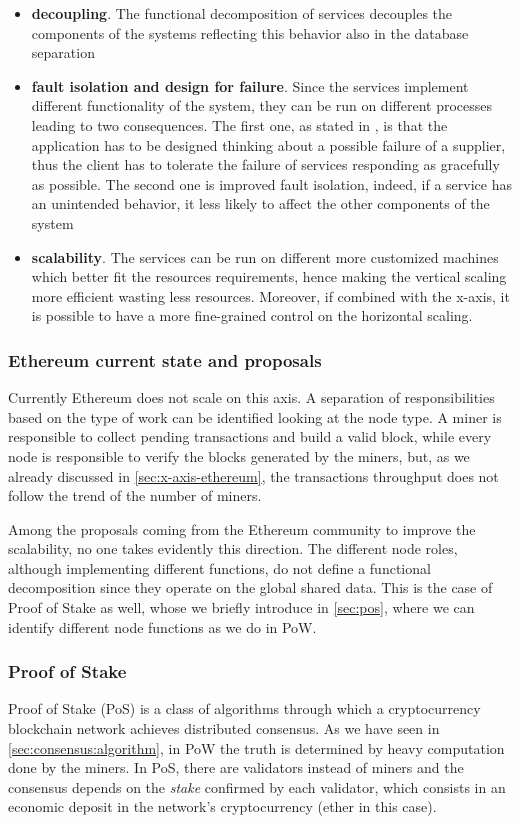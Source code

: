 \begin{itemize}
	\item \textbf{decoupling}. The functional decomposition of services
    decouples the components of the systems reflecting this behavior also in 
    the database separation
	\item \textbf{fault isolation and design for failure}. Since the services
	implement different functionality of the system, they can be run on different
	processes leading to two consequences. The first one, as stated in
	\cite{bib:microservices-martin-fowler}, is that the application has to be
	designed thinking about a possible failure of a supplier, thus the client has
	to tolerate the failure of services responding as gracefully as possible. The
	second one is improved fault isolation, indeed, if a service has an unintended
	behavior, it less likely to affect the other components of the system
	\item \textbf{scalability}. The services can be run on different more
	customized machines which better fit the resources requirements, hence making
	the vertical scaling more efficient wasting less resources. Moreover, if
	combined with the x-axis, it is possible to have a more fine-grained control
	on the horizontal scaling.
\end{itemize}

\subsubsection{Ethereum current state and proposals}
Currently Ethereum does not scale on this axis. A separation of responsibilities
based on the type of work can be identified looking at the node type. A miner is
responsible to collect pending transactions and build a valid block, while every
node is responsible to verify the blocks generated by the miners, but, as we
already discussed in \autoref{sec:x-axis-ethereum}, the transactions throughput
does not follow the trend of the number of miners.

Among the proposals coming from the Ethereum community to improve the
scalability, no one takes evidently this direction. The different node roles,
although implementing different functions, do not define a functional
decomposition since they operate on the global shared data. This is the case of
Proof of Stake as well, whose we briefly introduce in \autoref{sec:pos}, where
we can identify different node functions as we do in PoW.

\subsubsection{Proof of Stake}
\label{sec:pos}
Proof of Stake (PoS) is a class of algorithms through which a cryptocurrency
blockchain network achieves distributed consensus. As we have seen in
\autoref{sec:consensus:algorithm}, in PoW the truth is determined by heavy
computation done by the miners. In PoS, there are validators instead of miners
and the consensus depends on the \emph{stake} confirmed by each validator, which
consists in an economic deposit in the network's cryptocurrency (ether in this
case).

